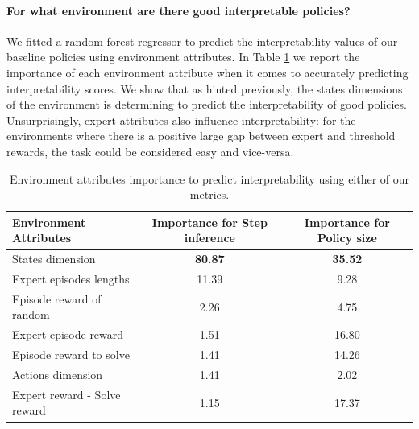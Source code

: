 \paragraph{For what environment are there good interpretable policies?}
We fitted a random forest regressor \cite{random} to predict the interpretability values of our baseline policies using environment attributes. In Table \ref{tab:combined_importance} we report the importance of each environment attribute when it comes to accurately predicting interpretability scores. We show that as hinted previously, the states dimensions of the environment is determining to predict the interpretability of good policies. Unsurprisingly, expert attributes also influence interpretability: for the environments where there is a positive large gap between expert and threshold rewards, the task could be considered easy and vice-versa.

\begin{table}
\centering
\small
\begin{tabular}{lcc}
\toprule
Environment Attributes & Importance for Step inference & Importance for Policy size \\
\midrule
States dimension & \textbf{80.87} & \textbf{35.52} \\
Expert episodes lengths & 11.39 & 9.28 \\
Episode reward of random & 2.26 & 4.75 \\
Expert episode reward & 1.51 & 16.80 \\
Episode reward to solve & 1.41 & 14.26 \\
Actions dimension & 1.41 & 2.02 \\
Expert reward - Solve reward & 1.15 & 17.37 \\
\bottomrule
\end{tabular}
\caption{Environment attributes importance to predict interpretability using either of our metrics.}
\label{tab:combined_importance}
\end{table}

